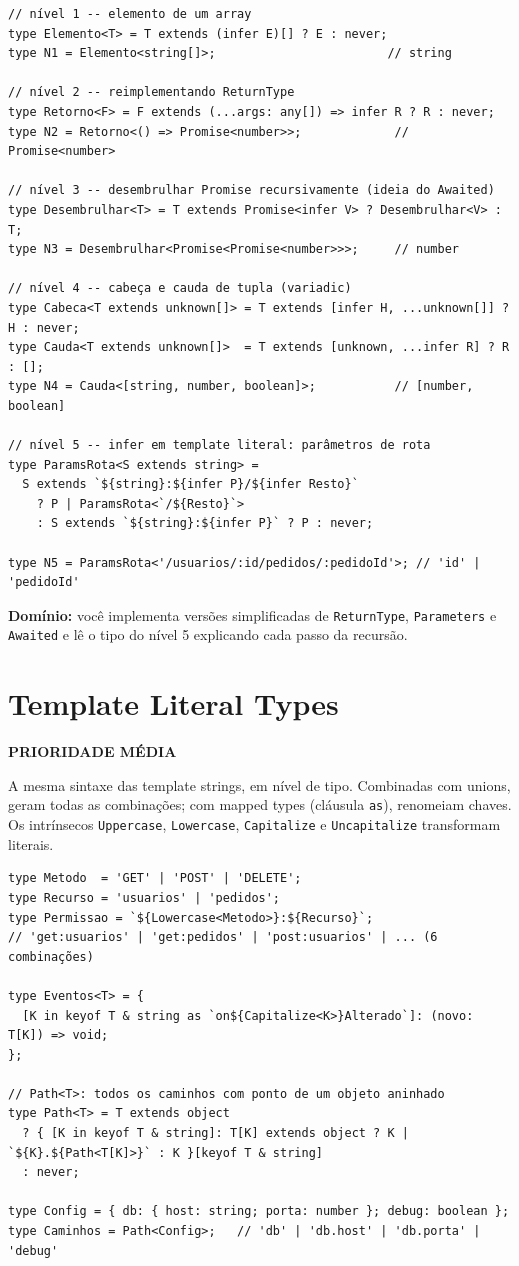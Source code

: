 \documentclass[12pt,a4paper,oneside]{book}
\newcommand{\media}{\colorbox{orange!20}{\sffamily\scriptsize\bfseries PRIORIDADE MÉDIA}}
\newcommand{\code}[1]{\texttt{#1}}
\newcommand{\dom}[1]{\begin{dominio}\textbf{Domínio:} #1\end{dominio}}
\begin{document}
\begin{verbatim}
// nível 1 -- elemento de um array
type Elemento<T> = T extends (infer E)[] ? E : never;
type N1 = Elemento<string[]>;                        // string

// nível 2 -- reimplementando ReturnType
type Retorno<F> = F extends (...args: any[]) => infer R ? R : never;
type N2 = Retorno<() => Promise<number>>;             // Promise<number>

// nível 3 -- desembrulhar Promise recursivamente (ideia do Awaited)
type Desembrulhar<T> = T extends Promise<infer V> ? Desembrulhar<V> : T;
type N3 = Desembrulhar<Promise<Promise<number>>>;     // number

// nível 4 -- cabeça e cauda de tupla (variadic)
type Cabeca<T extends unknown[]> = T extends [infer H, ...unknown[]] ? H : never;
type Cauda<T extends unknown[]>  = T extends [unknown, ...infer R] ? R : [];
type N4 = Cauda<[string, number, boolean]>;           // [number, boolean]

// nível 5 -- infer em template literal: parâmetros de rota
type ParamsRota<S extends string> =
  S extends `${string}:${infer P}/${infer Resto}`
    ? P | ParamsRota<`/${Resto}`>
    : S extends `${string}:${infer P}` ? P : never;

type N5 = ParamsRota<'/usuarios/:id/pedidos/:pedidoId'>; // 'id' | 'pedidoId'
\end{verbatim}

\dom{você implementa versões simplificadas de \code{ReturnType}, \code{Parameters} e \code{Awaited} e lê o tipo do nível 5 explicando cada passo da recursão.}

\section{Template Literal Types}
\label{sec:template}
\media

A mesma sintaxe das template strings, em nível de tipo. Combinadas com unions, geram todas as combinações; com mapped types (cláusula \code{as}), renomeiam chaves. Os intrínsecos \code{Uppercase}, \code{Lowercase}, \code{Capitalize} e \code{Uncapitalize} transformam literais.

\begin{verbatim}
type Metodo  = 'GET' | 'POST' | 'DELETE';
type Recurso = 'usuarios' | 'pedidos';
type Permissao = `${Lowercase<Metodo>}:${Recurso}`;
// 'get:usuarios' | 'get:pedidos' | 'post:usuarios' | ... (6 combinações)

type Eventos<T> = {
  [K in keyof T & string as `on${Capitalize<K>}Alterado`]: (novo: T[K]) => void;
};

// Path<T>: todos os caminhos com ponto de um objeto aninhado
type Path<T> = T extends object
  ? { [K in keyof T & string]: T[K] extends object ? K | `${K}.${Path<T[K]>}` : K }[keyof T & string]
  : never;

type Config = { db: { host: string; porta: number }; debug: boolean };
type Caminhos = Path<Config>;   // 'db' | 'db.host' | 'db.porta' | 'debug'
\end{verbatim}
\end{document}
